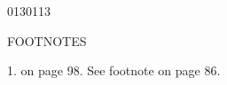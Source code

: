 \begin{scanpage}{0130}{113}
\begin{center}FOOTNOTES\end{center}
1. on page 98. See footnote on page 86.
\end{scanpage}
